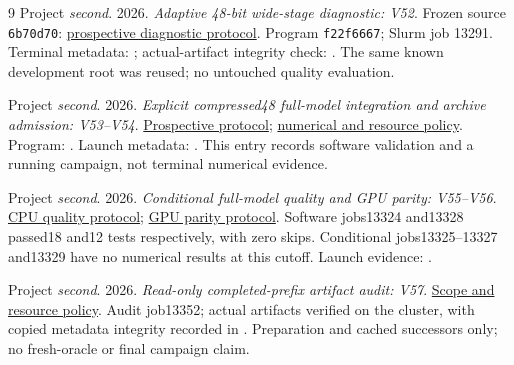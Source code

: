 \documentclass[10pt,twocolumn,letterpaper]{article}
\begin{document}
\begin{thebibliography}{9}
Project \emph{second}. 2026. \emph{Adaptive 48-bit wide-stage diagnostic: V52}.
Frozen source \texttt{6b70d70}:
\href{https://github.com/priyankjairaj100/second/blob/6b70d703a716cef744f49ba1c55add3a691c3267/research_v52/PROTOCOL.txt}{prospective diagnostic protocol}.
Program \texttt{f22f6667}; Slurm job 13291.
Terminal metadata: ;
actual-artifact integrity check: .
The same known development root was reused; no untouched quality evaluation.

Project \emph{second}. 2026. \emph{Explicit compressed48 full-model integration and archive admission: V53--V54}.
\href{https://github.com/priyankjairaj100/second/blob/9826a95/research_v54/PROTOCOL.txt}{Prospective protocol};
\href{https://github.com/priyankjairaj100/second/blob/7f3b10d/research_v53/PROTOCOL.txt}{numerical and resource policy}.
Program: .
Launch metadata: .
This entry records software validation and a running campaign, not terminal numerical evidence.


Project \emph{second}. 2026. \emph{Conditional full-model quality and GPU parity: V55--V56}.
\href{https://github.com/priyankjairaj100/second/blob/792400b/research_v55/PROTOCOL.txt}{CPU quality protocol};
\href{https://github.com/priyankjairaj100/second/blob/5dcd24c/research_v56/PROTOCOL.txt}{GPU parity protocol}.
Software jobs13324 and13328 passed18 and12 tests respectively, with zero skips.
Conditional jobs13325--13327 and13329 have no numerical results at this cutoff.
Launch evidence: .


Project \emph{second}. 2026. \emph{Read-only completed-prefix artifact audit: V57}.
\href{https://github.com/priyankjairaj100/second/blob/a13a0c8/research_v57/README.md}{Scope and resource policy}.
Audit job13352; actual artifacts verified on the cluster, with copied metadata
integrity recorded in .
Preparation and cached successors only; no fresh-oracle or final campaign claim.

\end{thebibliography}
\end{document}
